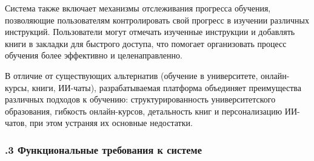{  \par \redline Система также включает механизмы отслеживания прогресса обучения, позволяющие пользователям контролировать свой прогресс в изучении различных инструкций. Пользователи могут отмечать изученные инструкции и добавлять книги в закладки для быстрого доступа, что помогает организовать процесс обучения более эффективно и целенаправленно.

  \par \redline В отличие от существующих альтернатив (обучение в университете, онлайн-курсы, книги, ИИ-чаты), разрабатываемая платформа объединяет преимущества различных подходов к обучению: структурированность университетского образования, гибкость онлайн-курсов, детальность книг и персонализацию ИИ-чатов, при этом устраняя их основные недостатки.

  \par
}

\subtitlespace

\subsubsection*{ 
  \gostTitleFont
  .3 Функциональные требования к системе
} 

\subtitlespace

